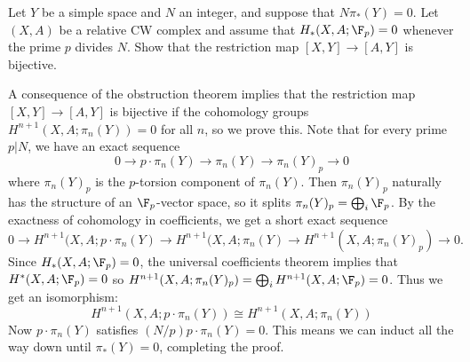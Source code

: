 \documentclass[11pt,letterpaper]{article}
\begin{document}
\begin{problem}
    Let $Y$ be a simple space and $N$ an integer, and suppose that $N\pi_*(Y) = 0$. Let $(X,A)$ be a relative CW complex and assume that $H_*(X, A; \F_p)=0$ whenever the prime $p$ divides $N$. Show that the restriction map $[X, Y] \to [A, Y]$ is bijective.  
\end{problem}
\quad A consequence of the obstruction theorem implies that the restriction map $[X,Y] \to [A,Y]$ is bijective if the cohomology groups $H^{n+1}(X,A; \pi_n(Y)) =0$ for all $n$, so we prove this. Note that for every prime $p|N$, we have an exact sequence
\[
    0\to p\cdot\pi_n(Y) \to \pi_n(Y) \to \pi_n(Y)_p \to 0
\]
where $\pi_n(Y)_p$ is the $p$-torsion component of $\pi_n(Y)$. Then $\pi_n(Y)_p$ naturally has the structure of an $\F_p$-vector space, so it splits $\pi_n(Y)_p = \bigoplus_i \F_p$. By the exactness of cohomology in coefficients, we get a short exact sequence
\[
    0 \to H^{n+1}(X, A; p\cdot \pi_n(Y) \to H^{n+1}(X, A; \pi_n(Y) \to H^{n+1}(X, A; \pi_n(Y)_p) \to 0
.\] 
Since $H_*(X, A; \F_p)=0$, the universal coefficients theorem implies that $H^*(X, A; \F_p)=0$ so $H^{n+1}(X, A; \pi_n(Y)_p) = \bigoplus_i H^{n+1}(X, A; \F_p)=0$. Thus we get an isomorphism:
\[
    H^{n+1}(X,A; p\cdot \pi_n(Y)) \cong H^{n+1}(X,A; \pi_n(Y))
\]  
Now $p\cdot \pi_n(Y)$ satisfies $(N / p)p\cdot \pi_n(Y)=0$. This means we can induct all the way down until $\pi_*(Y)=0$, completing the proof.  
\end{document}

